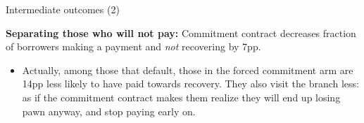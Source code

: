 \documentclass[8pt]{beamer}
\begin{document}
\begin{frame}{Intermediate outcomes (2)}

\begin{table}[H]
\caption{Intermediate outcomes}
\begin{center}
\footnotesize{}
\end{center}
\end{table}

   \vfill \item  \textbf{Separating those who will not pay:} Commitment contract decreases fraction of borrowers making a payment and \textit{not} recovering by 7pp.
    \begin{itemize}
        \item Actually, among those that default, those in the forced commitment arm are 14pp less likely to have paid towards recovery. They also visit the branch less: as if the commitment contract makes them realize they will end up losing pawn anyway, and stop paying early on.
    \end{itemize}
\end{frame}







     
\end{document}
